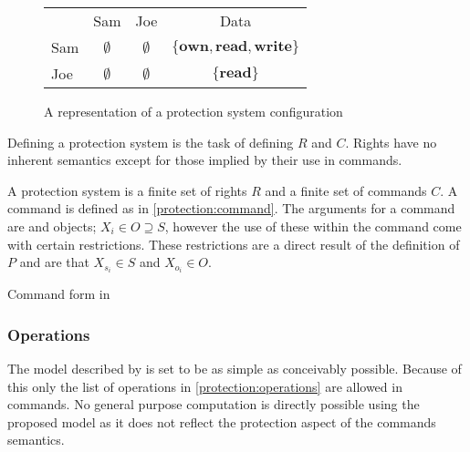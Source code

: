 \begin{figure}[h]
\centering
\begin{tabular}{l|c|c|c|}
\multicolumn{1}{c}{} & \multicolumn{1}{c}{Sam} & \multicolumn{1}{c}{Joe} & \multicolumn{1}{c}{Data} \\\cline{2-4}
Sam & $\emptyset$ & $\emptyset$ & $\{\textbf{own}, \textbf{read}, \textbf{write}\}$ \\\cline{2-4}
Joe & $\emptyset$ & $\emptyset$ & $\{\textbf{read}\}$ \\\cline{2-4}
\end{tabular}
\caption{A representation of a protection system configuration}
\label{protection:matrixsmall}
\end{figure}

Defining a protection system is the task of defining $R$ and $C$.
Rights have no inherent semantics except for those implied by their use in commands.

\begin{definition}
A protection system is a finite set of rights $R$ and a finite set of commands $C$.
A command is defined as in \cref{protection:command}.
The arguments for a command are \subjects{} and objects; $X_i \in O \supseteq S$, however the use of these within the command come with certain restrictions.
These restrictions are a direct result of the definition of $P$ and are that $X_{s_i} \in S$ and $X_{o_i} \in O$.
\end{definition}

\begin{algorithm}
  \DontPrintSemicolon
  \cmd {} 
  \caption{Command form in \cite{HRU}\label{protection:command}}
\end{algorithm}

\subsubsection{Operations}
The model described by \cite{HRU} is set to be as simple as conceivably possible.
Because of this only the list of operations in \cref{protection:operations} are allowed in commands.
No general purpose computation is directly possible using the proposed model as it does not reflect the protection aspect of the commands semantics.

